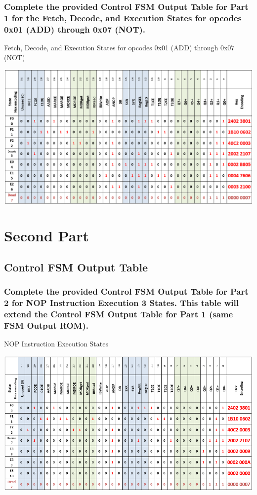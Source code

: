 \documentclass{article}
\begin{document}
	\subsubsection {Complete the provided Control FSM Output Table for Part 1 for the Fetch, Decode, and Execution States for opcodes 0x01 (ADD) through 0x07 (NOT).}
	\begin{table}[!ht]
		\centering
		\caption{Fetch, Decode, and Execution States for opcodes 0x01 (ADD) through 0x07 (NOT)}
		\vspace{0.2cm}
		\includegraphics[width=\linewidth]{fetch_decode_executionStates.png}		

	\end{table}
	
	\pagebreak
	
	\section{Second Part}
	\subsection {Control FSM Output Table}
	\subsubsection{Complete the provided Control FSM Output Table for Part 2 for NOP Instruction Execution 3 States. This table will extend the Control FSM Output Table for Part 1 (same FSM Output ROM).}
	\begin{table}[!ht]
		\centering
		\caption{NOP Instruction Execution States}
		\vspace{0.2cm}
		\includegraphics[width=\linewidth]{nop_instruction.png}
	\end{table}
\end{document}
